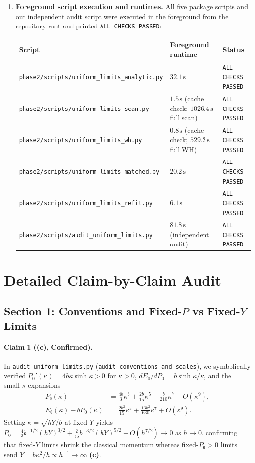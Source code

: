 \documentclass[11pt,a4paper]{article}
\newcommand{\C}{\textbf{(c)}}
\newcommand{\scr}[1]{\texttt{#1}}
\begin{document}
\begin{enumerate}
\item \textbf{Foreground script execution and runtimes.}
All five package scripts and our independent audit script were executed in the
foreground from the repository root and printed \texttt{ALL CHECKS PASSED}:
\begin{center}
\begin{tabular}{lll}
\toprule
Script & Foreground runtime & Status \\
\midrule
\scr{phase2/scripts/uniform\_limits\_analytic.py} & $32.1\,\text{s}$ & \texttt{ALL CHECKS PASSED} \\
\scr{phase2/scripts/uniform\_limits\_scan.py} & $1.5\,\text{s}$ (cache check; $1026.4\,\text{s}$ full scan) & \texttt{ALL CHECKS PASSED} \\
\scr{phase2/scripts/uniform\_limits\_wh.py} & $0.8\,\text{s}$ (cache check; $529.2\,\text{s}$ full WH) & \texttt{ALL CHECKS PASSED} \\
\scr{phase2/scripts/uniform\_limits\_matched.py} & $20.2\,\text{s}$ & \texttt{ALL CHECKS PASSED} \\
\scr{phase2/scripts/uniform\_limits\_refit.py} & $6.1\,\text{s}$ & \texttt{ALL CHECKS PASSED} \\
\scr{phase2/scripts/audit\_uniform\_limits.py} & $81.8\,\text{s}$ (independent audit) & \texttt{ALL CHECKS PASSED} \\
\bottomrule
\end{tabular}
\end{center}
\end{enumerate}

\section{Detailed Claim-by-Claim Audit}\label{sec:detailed}

\subsection{Section 1: Conventions and Fixed-$P$ vs Fixed-$Y$ Limits}
\paragraph{Claim 1 (\C, Confirmed).}
In \scr{audit\_uniform\_limits.py} (\texttt{audit\_conventions\_and\_scales}), we
symbolically verified $P_0'(\kappa)=4b\kappa\sinh\kappa>0$ for $\kappa>0$,
$dE_0/dP_0=b\sinh\kappa/\kappa$, and the small-$\kappa$ expansions
\begin{align}
 P_0(\kappa) &= \frac{4b}{3}\kappa^3 + \frac{2b}{15}\kappa^5 + \frac{b}{210}\kappa^7 + O(\kappa^9), \nonumber\\
 E_0(\kappa) - b P_0(\kappa) &= \frac{2b^2}{15}\kappa^5 + \frac{13b^2}{630}\kappa^7 + O(\kappa^9). \label{eq:E0_minus_bP0}
\end{align}
Setting $\kappa=\sqrt{hY/b}$ at fixed $Y$ yields
$P_0=\frac43 b^{-1/2}(hY)^{3/2}+\frac{2}{15}b^{-3/2}(hY)^{5/2}+O(h^{7/2})\to 0$
as $h\to 0$, confirming that fixed-$Y$ limits shrink the classical momentum
whereas fixed-$P_0>0$ limits send $Y=b\kappa^2/h\propto h^{-1}\to\infty$ \C.
\end{document}
